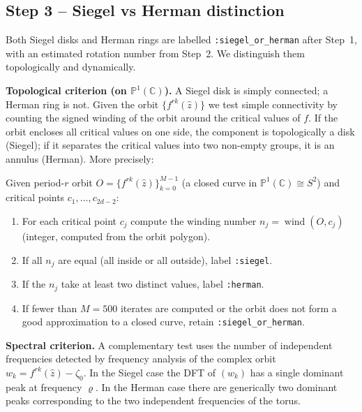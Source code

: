 \documentclass[12pt,a4paper]{article}
\newcommand{\Pone}{\mathbb{P}^1(\mathbb{C})}
\newcommand{\rot}{\varrho}    %
\begin{document}
\subsection{Step 3 -- Siegel vs Herman distinction}
\label{ssec:siegel_herman}

Both Siegel disks and Herman rings are labelled \texttt{:siegel\_or\_herman}
after Step~1, with an estimated rotation number from Step~2.
We distinguish them topologically and dynamically.

\medskip
\noindent\textbf{Topological criterion (on $\Pone$).}
A Siegel disk is simply connected; a Herman ring is not.
Given the orbit $\{f^{rk}(\hat{z})\}$ we test simple connectivity by
counting the signed winding of the orbit around the critical values of $f$.
If the orbit encloses all critical values on one side, the component is
topologically a disk (Siegel); if it separates the critical values into two
non-empty groups, it is an annulus (Herman).
More precisely:

\begin{algorithm}
  \caption{Siegel/Herman topological test}
  \label{alg:topology}
  Given period-$r$ orbit $O = \{f^{rk}(\hat{z})\}_{k=0}^{M-1}$ (a closed
  curve in $\Pone \cong S^2$) and critical points $c_1,\ldots,c_{2d-2}$:
  \begin{enumerate}
    \item For each critical point $c_j$ compute the winding number
          $n_j = \operatorname{wind}(O, c_j)$ (integer, computed from
          the orbit polygon).
    \item If all $n_j$ are equal (all inside or all outside), label
          \texttt{:siegel}.
    \item If the $n_j$ take at least two distinct values, label
          \texttt{:herman}.
    \item If fewer than $M = 500$ iterates are computed or the orbit
          does not form a good approximation to a closed curve, retain
          \texttt{:siegel\_or\_herman}.
  \end{enumerate}
\end{algorithm}

\medskip
\noindent\textbf{Spectral criterion.}
A complementary test uses the number of independent frequencies detected by
frequency analysis \cite{Laskar1993} of the complex orbit
$w_k = f^{rk}(\hat{z}) - \zeta_0$.
In the Siegel case the DFT of $(w_k)$ has a single dominant peak at
frequency $\rot$.
In the Herman case there are generically two dominant peaks corresponding to
the two independent frequencies of the torus.
\end{document}
